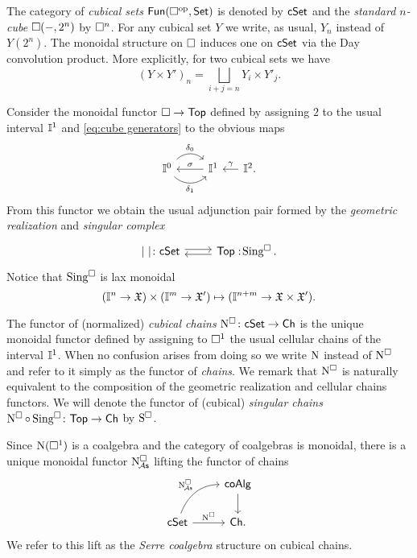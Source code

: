 The category of \textit{cubical sets} $\mathsf{Fun}(\square^{\mathrm{op}}, \mathsf{Set})$ is denoted by $\mathsf{cSet}$ and
the \textit{standard $n$-cube} $\square(-, 2^n)$ by $\square^n$.
For any cubical set $Y$ we write, as usual, $Y_n$ instead of $Y(2^n)$.
The monoidal structure on $\square$ induces one on $\mathsf{cSet}$ via the Day convolution product.
More explicitly, for two cubical sets we have
\[
(Y \times Y')_n = \bigsqcup_{i+j=n} Y_i \times Y'_j.
\]

Consider the monoidal functor $\square \to \mathsf{Top}$ defined by assigning $2$ to the usual interval $\mathbb{I}^1$ and \eqref{eq:cube generators} to the obvious maps
\[
\begin{tikzcd}
	\gcube^0 \arrow[r, out=45, in=135, "\delta_0"] \arrow[r, out=-45, in=-135, "\delta_1"'] & \gcube^1 \arrow[l, "\sigma"'] &[-10pt] \arrow[l, "\gamma"'] \gcube^2.
\end{tikzcd}
\]
From this functor we obtain the usual adjunction pair formed by the \textit{geometric realization} and \textit{singular complex}
\[
\begin{tikzcd}
	\bars{\ } \colon \cSet \arrow[r, shift left=.5ex] &
	\Top :\! \cSing. \arrow[l, shift left=.5ex]
\end{tikzcd}
\]
Notice that $\operatorname{Sing^{\square}}$ is lax monoidal
\[
(\mathbb{I}^n \to \mathfrak{X}) \times (\mathbb{I}^m \to \mathfrak{X}') \mapsto (\mathbb{I}^{n+m} \to \mathfrak{X} \times \mathfrak{X}').
\]


The functor of (normalized) \textit{cubical chains} $\operatorname{N^{\square}} \colon \mathsf{cSet} \to \mathsf{Ch}$ is the unique monoidal functor defined by assigning to $\square^1$ the usual cellular chains of the interval $\mathbb{I}^1$.
When no confusion arises from doing so we write $\operatorname{N}$ instead of $\operatorname{N^{\square}}$ and refer to it simply as the functor of \textit{chains}.
We remark that $\operatorname{N^{\square}}$ is naturally equivalent to the composition of the geometric realization and cellular chains functors.
We will denote the functor of (cubical) \textit{singular chains} $\operatorname{N^{\square}} \circ \operatorname{Sing^{\square}} \colon \mathsf{Top} \to \mathsf{Ch}$ by $\operatorname{S^{\square}}$.

Since $\operatorname{N}(\square^1)$ is a coalgebra and the category of coalgebras is monoidal, there is a unique monoidal functor
$\operatorname{N^{\square}_{\!{\mathcal{A}\mathsf{s}}}}$ lifting the functor of chains
\[
\begin{tikzcd}
	& \coAlg \arrow[d] \\
	\cSet \arrow[r, "\cchains"] \arrow[ur, "\cchainsA", out=70, in=180] & \Ch.
\end{tikzcd}
\]
We refer to this lift as the \textit{Serre coalgebra} structure on cubical chains.

